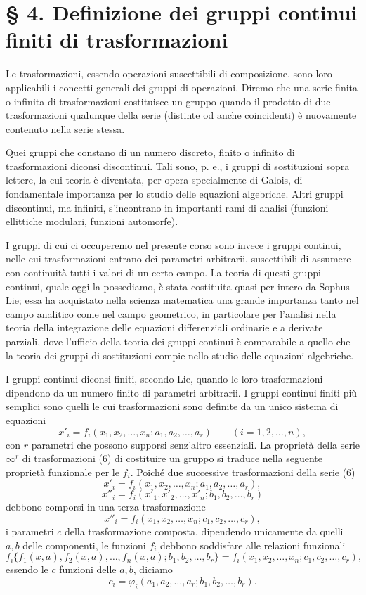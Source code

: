 \documentclass[11pt]{book}
\begin{document}
\section*{\S{} 4. Definizione dei gruppi continui finiti di trasformazioni}

Le trasformazioni, essendo operazioni suscettibili di composizione, sono loro applicabili i concetti generali dei gruppi di operazioni. Diremo che una serie finita o infinita di trasformazioni costituisce un gruppo quando il prodotto di due trasformazioni qualunque della serie (distinte od anche coincidenti) è nuovamente contenuto nella serie stessa.

Quei gruppi che constano di un numero discreto, finito o infinito di trasformazioni diconsi discontinui. Tali sono, p. e., i gruppi di sostituzioni sopra lettere, la cui teoria è diventata, per opera specialmente di Galois, di fondamentale importanza per lo studio delle equazioni algebriche. Altri gruppi discontinui, ma infiniti, s'incontrano in importanti rami di analisi (funzioni ellittiche modulari, funzioni automorfe).

I gruppi di cui ci occuperemo nel presente corso sono invece i gruppi continui, nelle cui trasformazioni entrano dei parametri arbitrarii, suscettibili di assumere con continuità tutti i valori di un certo campo. La teoria di questi gruppi continui, quale oggi la possediamo, è stata costituita quasi per intero da Sophus Lie; essa ha acquistato nella scienza matematica una grande importanza tanto nel campo analitico come nel campo geometrico, in particolare per l'analisi nella teoria della integrazione delle equazioni differenziali ordinarie e a derivate parziali, dove l'ufficio della teoria dei gruppi continui è comparabile a quello che la teoria dei gruppi di sostituzioni compie nello studio delle equazioni algebriche.

I gruppi continui diconsi finiti, secondo Lie, quando le loro trasformazioni dipendono da un numero finito di parametri arbitrarii. I gruppi continui finiti più semplici sono quelli le cui trasformazioni sono definite da un unico sistema di equazioni
\begin{equation*}\tag{6}
 x'_i=f_i(x_1,x_2,\ldots,x_n;a_1,a_2,\ldots,a_r)\qquad (i=1,2,\ldots,n),
\end{equation*}
con $r$ parametri che possono supporsi senz'altro essenziali. La proprietà della serie $\infty^r$ di trasformazioni (6) di costituire un gruppo si traduce nella seguente proprietà funzionale per le $f_i$. Poiché due successive trasformazioni della serie (6)
\[
 x'_i=f_i(x_1,x_2,\ldots,x_n;a_1,a_2,\ldots,a_r),
\]
\[
 x''_i=f_i(x'_1,x'_2,\ldots,x'_n;b_1,b_2,\ldots,b_r)
\]
debbono comporsi in una terza trasformazione
\[
 x''_i=f_i(x_1,x_2,\ldots,x_n;c_1,c_2,\ldots,c_r),
\]
i parametri $c$ della trasformazione composta, dipendendo unicamente da quelli $a,b$ delle componenti, le funzioni $f_i$ debbono soddisfare alle relazioni funzionali
\[
 f_i\{f_1(x,a),f_2(x,a),\ldots,f_n(x,a);b_1,b_2,\ldots,b_r\}=f_i(x_1,x_2,\ldots,x_n;c_1,c_2,\ldots,c_r),
\]
essendo le $c$ funzioni delle $a,b$, diciamo
\[
 c_i=\varphi_i(a_1,a_2,\ldots,a_r;b_1,b_2,\ldots,b_r).
\]
\end{document}
